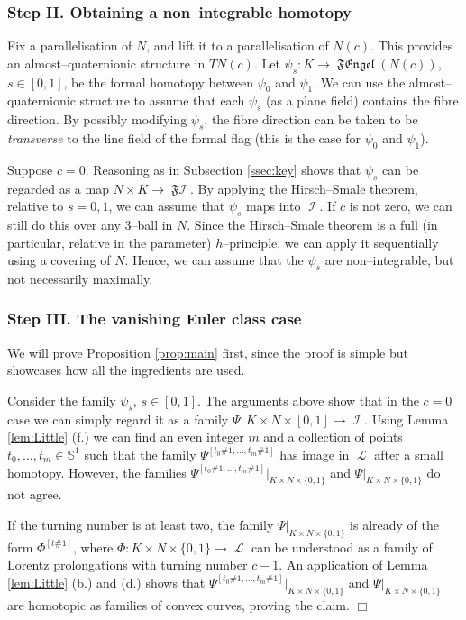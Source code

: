 \documentclass[10pt]{amsart}
\newcommand{\FEngel}{\operatorname{\mathfrak{FEngel}}}
\newcommand{\SL}{\operatorname{\mathcal{L}}}
\newcommand{\Imm}{\operatorname{\mathcal{I}}}
\newcommand{\FImm}{\operatorname{\mathfrak{F}\mathcal{I}}}
\newcommand{\NS}{{\mathbb{S}}}
\theoremstyle{definition}
\begin{document}
\subsubsection{Step II. Obtaining a non--integrable homotopy}

Fix a parallelisation of $N$, and lift it to a parallelisation of $N(c)$. This provides an almost--quaternionic structure in $TN(c)$. Let $\psi_s: K \to \FEngel(N(c))$, $s \in [0,1]$, be the formal homotopy between $\psi_0$ and $\psi_1$. We can use the almost--quaternionic structure to assume that each $\psi_s$ (as a plane field) contains the fibre direction. By possibly modifying $\psi_s$, the fibre direction can be taken to be \emph{transverse} to the line field of the formal flag (this is the case for $\psi_0$ and $\psi_1$).

Suppose $c=0$. Reasoning as in Subsection \ref{ssec:key} shows that $\psi_s$ can be regarded as a map $N \times K \to \FImm$. By applying the Hirsch--Smale theorem, relative to $s=0,1$, we can assume that $\psi_s$ maps into $\Imm$. If $c$ is not zero, we can still do this over any $3$--ball in $N$. Since the Hirsch--Smale theorem is a full (in particular, relative in the parameter) $h$--principle, we can apply it sequentially using a covering of $N$. Hence, we can assume that the $\psi_s$ are non--integrable, but not necessarily maximally.


\subsubsection{Step III. The vanishing Euler class case}

We will prove Proposition \ref{prop:main} first, since the proof is simple but showcases how all the ingredients are used.

Consider the family $\psi_s$, $s \in [0,1]$. The arguments above show that in the $c=0$ case we can simply regard it as a family $\Psi: K \times N \times [0,1] \to \Imm$. Using Lemma \ref{lem:Little} (f.) we can find an even integer $m$ and a collection of points $t_0,\dots,t_m \in \NS^1$ such that the family $\Psi^{[t_0\#1,\dots,t_m\#1]}$ has image in $\SL$ after a small homotopy. However, the families $\Psi^{[t_0\#1,\dots,t_m\#1]}|_{K \times N \times \{0,1\}}$ and $\Psi|_{K \times N \times \{0,1\}}$ do not agree. 

If the turning number is at least two, the family $\Psi|_{K \times N \times \{0,1\}}$ is already of the form $\Phi^{[t\#1]}$, where $\Phi: K \times N \times \{0,1\} \to \SL$ can be understood as a family of Lorentz prolongations with turning number $c-1$. An application of Lemma \ref{lem:Little} (b.) and (d.) shows that $\Psi^{[t_0\#1,\dots,t_m\#1]}|_{K \times N \times \{0,1\}}$ and $\Psi|_{K \times N \times \{0,1\}}$ are homotopic as families of convex curves, proving the claim. \hfill $\Box$
\end{document}
